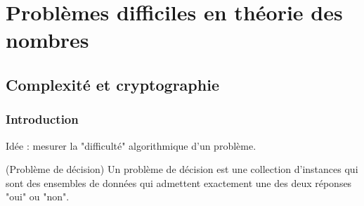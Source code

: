 \chapter{Problèmes difficiles en théorie des nombres}
    \section{Complexité et cryptographie}
        \subsection{Introduction}
            Idée : mesurer la "difficulté" algorithmique d'un problème.
            \begin{defi} (Problème de décision)
                Un problème de décision est une collection d'instances qui sont des ensembles de données qui admettent exactement une des deux réponses "oui" ou "non".
            \end{defi}
